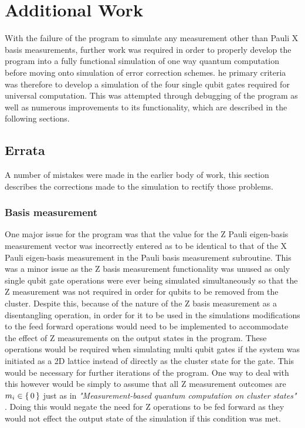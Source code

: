
\chapter{Additional Work} %

\label{ch:additional} %

With the failure of the program to simulate any measurement other than Pauli X basis measurements, further work was required in order to properly develop the program into a fully functional simulation of one way quantum computation before moving onto simulation of error correction schemes. he primary criteria was therefore to develop a simulation of the four single qubit gates required for universal computation. This was attempted through debugging of the program as well as numerous improvements to its functionality, which are described in the following sections.


\section{Errata}

A number of mistakes were made in the earlier body of work, this section describes the corrections made to the simulation to rectify those problems. 


\subsection{Basis measurement}

One major issue for the program was that the value for the Z Pauli eigen-basis measurement vector was incorrectly entered as to be identical to that of the X Pauli eigen-basis measurement in the Pauli basis measurement subroutine. This was a minor issue as the Z basis measurement functionality was unused as only single qubit gate operations were ever being simulated simultaneously so that the Z measurement was not required in order for qubits to be removed from the cluster. Despite this, because of the nature of the Z basis measurement as a disentangling operation, in order for it to be used in the simulations modifications to the feed forward operations would need to be implemented to accommodate the effect of Z measurements on the output states in the program. These operations would be required when simulating multi qubit gates if the system was initiated as a 2D lattice instead of directly as the cluster state for the gate. This would be necessary for further iterations of the program. One way to deal with this however would be simply to assume that all Z measurement outcomes are $m_{i} \in \set{0}$ just as in \textit{"Measurement-based quantum computation on cluster states"} \citep{raussendorf_measurement-based_2003}. Doing this would negate the need for Z operations to be fed forward as they would not effect the output state of the simulation if this condition was met.

